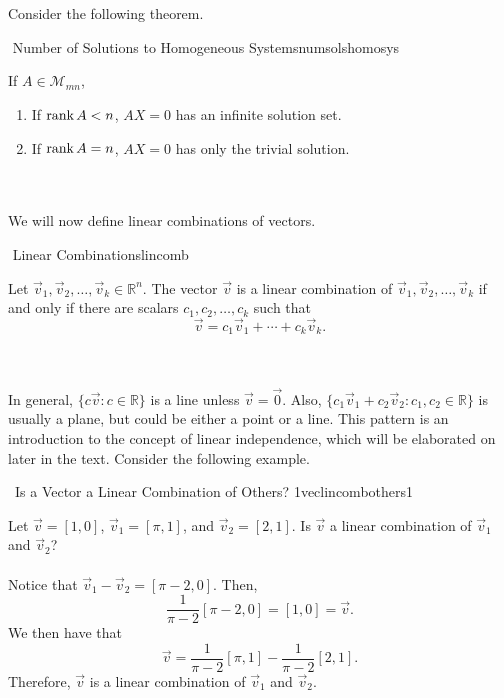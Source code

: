         \vphantom
        \\
        \\
        Consider the following theorem. 
        \begin{theorem}{\Stop\,\,Number of Solutions to Homogeneous Systems}{numsolshomosys}
        
            If \(A\in\mathcal{M}_{mn}\),
            \begin{enumerate}
                \item If \(\text{rank\,} A< n\), \(AX=0\) has an infinite solution set.
                \item If \(\text{rank\,} A= n\), \(AX=0\) has only the trivial solution.
            \end{enumerate}
        
        \end{theorem}
        \pagebreak
        \vphantom
        \\
        \\
        We will now define linear combinations of vectors.
        \begin{definition}{\Stop\,\,Linear Combinations}{lincomb}
    
            Let \(\vec{v}_1,\vec{v}_2,\ldots,\vec{v}_k\in\mathbb{R}^n\). The vector \(\vec{v}\) is a linear combination of \(\vec{v}_1,\vec{v}_2,\ldots,\vec{v}_k\) if and only if there are scalars \(c_1,c_2,\ldots,c_k\) such that 
            \begin{equation*}
                \vec{v}=c_1\vec{v}_1+\cdots+c_k\vec{v}_k.
            \end{equation*}
            
        \end{definition}
        \vphantom
        \\
        \\
        In general, \(\{c\vec{v}:c\in\mathbb{R}\}\) is a line unless \(\vec{v}=\vec{0}\). Also, \(\{c_1\vec{v}_1+c_2\vec{v}_2:c_1,c_2\in\mathbb{R}\}\) is usually a plane, but could be either a point or a line. This pattern is an introduction to the concept of linear independence, which will be elaborated on later in the text. Consider the following example.
        \begin{example}{\Difficulty\,\Difficulty\,\,Is a Vector a Linear Combination of Others? 1}{veclincombothers1}
        
            Let \(\vec{v}=[1,0]\), \(\vec{v}_1=[\pi,1]\), and \(\vec{v}_2=[2,1]\). Is \(\vec{v}\) a linear combination of \(\vec{v}_1\) and \(\vec{v}_2\)?
            \\
            \\
            Notice that \(\vec{v}_1-\vec{v}_2=[\pi-2,0]\). Then,
            \begin{equation*}
                \frac{1}{\pi-2}[\pi-2,0]=[1,0]=\vec{v}.
            \end{equation*}
            We then have that
            \begin{equation*}
                \vec{v}=\frac{1}{\pi-2}[\pi,1]-\frac{1}{\pi-2}[2,1].
            \end{equation*}
            Therefore, \(\vec{v}\) is a linear combination of \(\vec{v}_1\) and \(\vec{v}_2\).
        \end{example}
